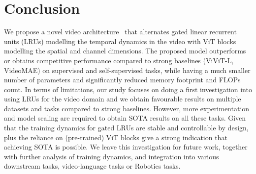 

\section{Conclusion}
\label{sec:conclusion}

We propose a novel video architecture \ssm\ that alternates gated linear recurrent units (LRUs) modelling the temporal dynamics in the video with ViT blocks modelling the spatial and channel dimensions.
The proposed model outperforms or obtains competitive performance compared to strong baselines (ViViT-L, VideoMAE) on supervised and self-supervised tasks, while having a much smaller number of parameters and significantly reduced memory footprint and FLOPs count. In terms of limitations, our study focuses on doing a first investigation into using LRUs for the video domain and we obtain favourable results on multiple datasets and tasks compared to strong baselines. However, more experimentation and model scaling are required to obtain SOTA results on all these tasks. Given that the training dynamics for gated LRUs are stable and controllable by design, plus the reliance on (pre-trained) ViT blocks give a strong indication that achieving SOTA is possible. We leave this investigation for future work, together with further analysis of training dynamics, and integration into various downstream tasks, \eg video-language tasks or Robotics tasks. 
